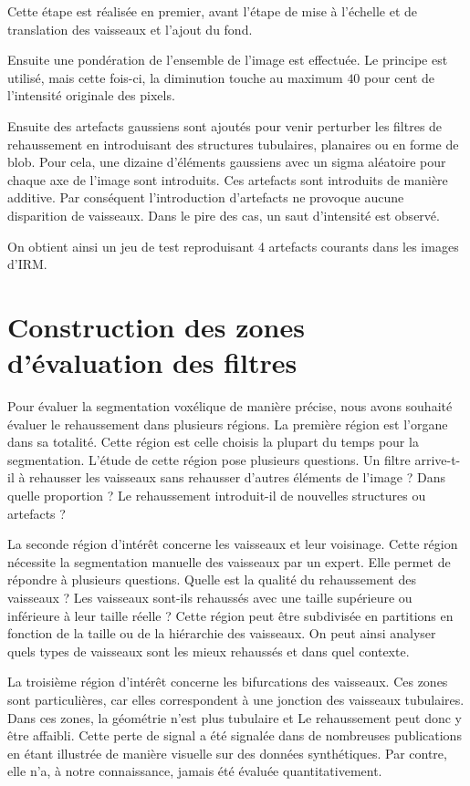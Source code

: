 Cette étape est réalisée en premier, avant l'étape de mise à l'échelle et de translation des vaisseaux et l'ajout du fond.

Ensuite une pondération de l'ensemble de l'image est effectuée. Le principe est utilisé, mais cette fois-ci, la diminution touche au maximum $40$ pour cent de l'intensité originale des pixels.

Ensuite des artefacts gaussiens sont ajoutés pour venir perturber les filtres de rehaussement en introduisant des structures tubulaires, planaires ou en forme de blob. Pour cela, une dizaine d'éléments gaussiens avec un sigma aléatoire pour chaque axe de l'image sont introduits. Ces artefacts sont introduits de manière additive. Par conséquent l'introduction d'artefacts ne provoque aucune disparition de vaisseaux. Dans le pire des cas, un saut d'intensité est observé.

On obtient ainsi un jeu de test reproduisant 4 artefacts courants dans les images d'IRM.
 
\section{Construction des zones d'évaluation des filtres}

Pour évaluer la segmentation voxélique de manière précise, nous avons souhaité évaluer le rehaussement dans plusieurs régions. La première région est l'organe dans sa totalité. Cette région est celle choisis la plupart du temps pour la segmentation. L'étude de cette région pose plusieurs questions. Un filtre arrive-t-il à rehausser les vaisseaux sans rehausser d'autres éléments de l'image ? Dans quelle proportion ? Le rehaussement introduit-il de nouvelles structures ou artefacts ?

La seconde région d'intérêt concerne les vaisseaux et leur voisinage. Cette région nécessite la segmentation manuelle des vaisseaux par un expert. Elle permet de répondre à plusieurs questions. Quelle est la qualité du rehaussement des vaisseaux ? Les vaisseaux sont-ils rehaussés avec une taille supérieure ou inférieure à leur taille réelle ? Cette région peut être subdivisée en partitions en fonction de la taille ou de la hiérarchie des vaisseaux. On peut ainsi analyser quels types de vaisseaux sont les mieux rehaussés et dans quel contexte.

La troisième région d'intérêt concerne les bifurcations des vaisseaux. Ces zones sont particulières, car elles correspondent à une jonction des vaisseaux tubulaires. Dans ces zones, la géométrie n'est plus tubulaire et Le rehaussement peut donc y être affaibli. Cette perte de signal a été signalée dans de nombreuses publications en étant illustrée de manière visuelle sur des données synthétiques. Par contre, elle n'a, à notre connaissance, jamais été évaluée quantitativement.

